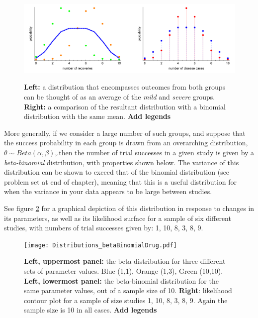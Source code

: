 \documentclass[11pt,fullpage]{book}
\begin{document}
\begin{figure}
\centering
\scalebox{0.5} 
{\includegraphics{Distributions_betaBinomialDispersion.pdf}}
\caption{\textbf{Left:} a distribution that encompasses outcomes from both groups can be thought of as an average of the \textit{mild} and \textit{severe} groups. \textbf{Right:} a comparison of the resultant distribution with a binomial distribution with the same mean. \textbf{Add legends}}\label{fig:Distributions_betaBinomialDispersion}
\end{figure} 

More generally, if we consider a large number of such groups, and suppose that the success probability in each group is drawn from an overarching distribution, $\theta\sim Beta(\alpha,\beta)$,.then the number of trial successes in a given study is given by a \textit{beta-binomial} distribution, with properties shown below. The variance of this distribution can be shown to exceed that of the binomial distribution (see problem set at end of chapter), meaning that this is a useful distribution for when the variance in your data appears to be large between studies.

See figure \ref{fig:Distributions_betaBinomialDrug} for a graphical depiction of this distribution in response to changes in its parameters, as well as its likelihood surface for a sample of six different studies, with numbers of trial successes given by: {1, 10, 8, 3, 8, 9}. 

\begin{figure}
\centering
\scalebox{0.5} 
{\texttt{[image: Distributions\_betaBinomialDrug.pdf]}}
\caption{\textbf{Left, uppermost panel:} the beta distribution for three different sets of parameter values. Blue (1,1), Orange (1,3), Green (10,10). \textbf{Left, lowermost panel:} the beta-binomial distribution for the same parameter values, out of a sample size of 10. \textbf{Right}: likelihood contour plot for a sample of size studies {1, 10, 8, 3, 8, 9}. Again the sample size is 10 in all cases. \textbf{Add legends}}\label{fig:Distributions_betaBinomialDrug}
\end{figure} 
\end{document}
